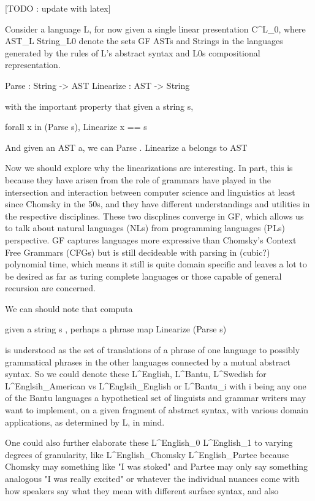 \documentclass[11pt, a4paper]{article}
\begin{document}
[TODO : update with latex]

Consider a language L, for now given a single linear presentation C^L_0, where
AST_L String_L0 denote the sets GF ASTs and Strings in the languages generated
by the rules of L's abstract syntax and L0s compositional representation.

  Parse : String -> {AST} Linearize : AST -> String

with the important property that given a string s,

  forall x in (Parse s), Linearize x == s

And given an AST a, we can Parse . Linearize a belongs to {AST}

Now we should explore why the linearizations are interesting. In part, this is
because they have arisen from the role of grammars have played in the
intersection and interaction between computer science and linguistics at least
since Chomsky in the 50s, and they have different understandings and utilities
in the respective disciplines. These two discplines converge in GF, which allows
us to talk about natural languages (NLs) from programming languages (PLs)
perspective. GF captures languages more expressive than Chomsky's Context Free
Grammars (CFGs) but is still decideable with parsing in (cubic?) polynomial
time, which means it still is quite domain specific and leaves a lot to be
desired as far as turing complete languages or those capable of general
recursion are concerned.

We can should note that computa

  given a string s , perhaps a phrase map Linearize (Parse s)

is understood as the set of translations of a phrase of one language to possibly
grammatical phrases in the other languages connected by a mutual abstract
syntax. So we could denote these L^English, L^Bantu, L^Swedish for
L^Englsih_American vs L^Englsih_English or L^Bantu_i with i being any one of the
Bantu languages a hypothetical set of linguists and grammar writers may want to
implement, on a given fragment of abstract syntax, with various domain
applications, as determined by L, in mind.

  One could also further elaborate these L^English_0 L^English_1 to varying
degrees of granularity, like L^English_Chomsky L^English_Partee because Chomsky
may something like "I was stoked" and Partee may only say something analogous "I
was really excited" or whatever the individual nuances come with how speakers
say what they mean with different surface syntax, and also
\end{document}
